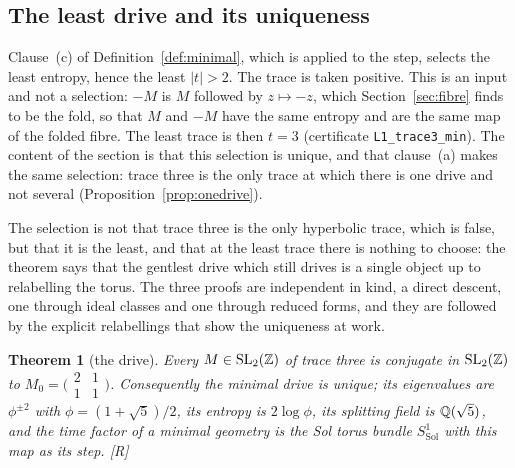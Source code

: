 \documentclass[11pt,a4paper]{article}
\theoremstyle{plain}
\newtheorem{theorem}{Theorem}[section]
\theoremstyle{definition}
\theoremstyle{remark}
\newcommand{\Sol}{\mathrm{Sol}}
\newcommand{\rigR}{[\textup{R}]}
\begin{document}
\subsection{The least drive and its uniqueness}

Clause~(c) of Definition~\ref{def:minimal}, which is applied to the step, selects the least entropy, hence the least $\lvert t\rvert>2$. The trace is taken positive. This is an input and not a selection: $-M$ is $M$ followed by $z\mapsto-z$, which Section~\ref{sec:fibre} finds to be the fold, so that $M$ and $-M$ have the same entropy and are the same map of the folded fibre. The least trace is then $t=3$ (certificate \texttt{L1\_trace3\_min}). The content of the section is that this selection is unique, and that clause~(a) makes the same selection: trace three is the only trace at which there is one drive and not several (Proposition~\ref{prop:onedrive}).

The selection is not that trace three is the only hyperbolic trace, which is false, but that it is the least, and that at the least trace there is nothing to choose: the theorem says that the gentlest drive which still drives is a single object up to relabelling the torus. The three proofs are independent in kind, a direct descent, one through ideal classes and one through reduced forms, and they are followed by the explicit relabellings that show the uniqueness at work.

\begin{theorem}[the drive]\label{thm:drive}
Every $M\in\mathrm{SL}_{2}(\mathbb{Z})$ of trace three is conjugate in $\mathrm{SL}_{2}(\mathbb{Z})$ to $M_{0}=\bigl(\begin{smallmatrix}2&1\\1&1\end{smallmatrix}\bigr)$. Consequently the minimal drive is unique; its eigenvalues are $\phi^{\pm2}$ with $\phi=(1+\sqrt5)/2$, its entropy is $2\log\phi$, its splitting field is $\mathbb{Q}(\sqrt5)$, and the time factor of a minimal geometry is the Sol torus bundle $S^{1}_{\Sol}$ with this map as its step. \rigR
\end{theorem}
\end{document}
